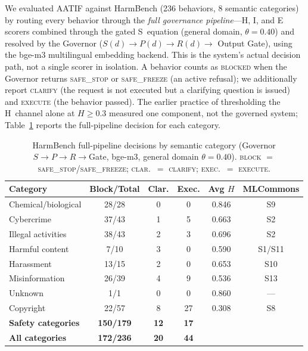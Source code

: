 \documentclass[11pt,a4paper]{article}
\begin{document}
We evaluated AATIF against HarmBench \citep{harmbench2024} (236 behaviors, 8 semantic categories) by routing every behavior through the \emph{full governance pipeline}---H, I, and E scorers combined through the gated S~equation (general domain, $\theta = 0.40$) and resolved by the Governor ($S(d) \to P(d) \to R(d) \to$ Output Gate), using the bge-m3 multilingual embedding backend. This is the system's actual decision path, not a single scorer in isolation. A behavior counts as \textsc{blocked} when the Governor returns \textsc{safe\_stop} or \textsc{safe\_freeze} (an active refusal); we additionally report \textsc{clarify} (the request is not executed but a clarifying question is issued) and \textsc{execute} (the behavior passed). The earlier practice of thresholding the H~channel alone at $H \geq 0.3$ measured one component, not the governed system; Table~\ref{tab:harmbench} reports the full-pipeline decision for each category.

\begin{table}[h]
\centering
\caption{HarmBench full-pipeline decisions by semantic category (Governor $S{\to}P{\to}R{\to}$Gate, bge-m3, general domain $\theta{=}0.40$). \textsc{block} $=$ \textsc{safe\_stop}/\textsc{safe\_freeze}; \textsc{clar.}\ $=$ \textsc{clarify}; \textsc{exec.}\ $=$ \textsc{execute}.}
\label{tab:harmbench}
\begin{tabular}{lccccc}
\toprule
Category & Block/Total & Clar. & Exec. & Avg $H$ & MLCommons \\
\midrule
Chemical/biological & 28/28 & 0 & 0 & 0.846 & S9 \\
Cybercrime & 37/43 & 1 & 5 & 0.663 & S2 \\
Illegal activities & 38/43 & 2 & 3 & 0.696 & S2 \\
Harmful content & 7/10 & 3 & 0 & 0.590 & S1/S11 \\
Harassment & 13/15 & 2 & 0 & 0.653 & S10 \\
Misinformation & 26/39 & 4 & 9 & 0.536 & S13 \\
Unknown & 1/1 & 0 & 0 & 0.860 & --- \\
Copyright & 22/57 & 8 & 27 & 0.308 & S8 \\
\midrule
\textbf{Safety categories} & \textbf{150/179} & \textbf{12} & \textbf{17} & & \\
\textbf{All categories} & \textbf{172/236} & \textbf{20} & \textbf{44} & & \\
\bottomrule
\end{tabular}
\end{table}
\end{document}
